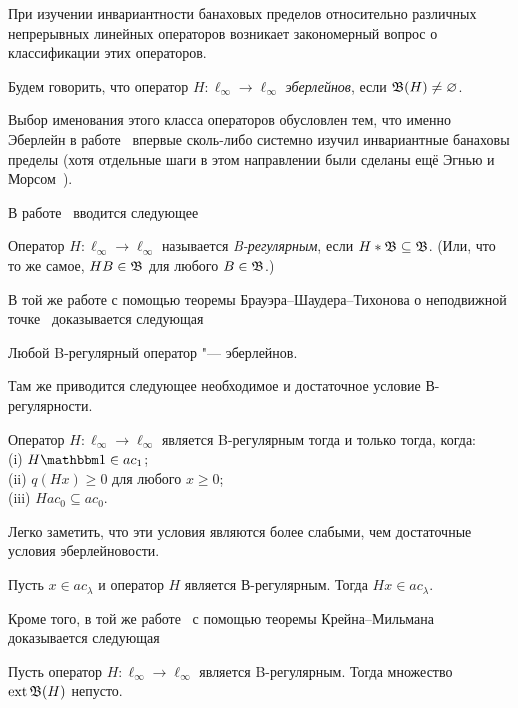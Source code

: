 При изучении инвариантности банаховых пределов относительно различных непрерывных линейных операторов
возникает закономерный вопрос о классификации этих операторов.

\begin{definition}
	Будем говорить, что оператор $H : \ell_\infty \to \ell_\infty$ \emph{эберлейнов},
	если $\mathfrak{B} (H) \ne \varnothing$.
\end{definition}

Выбор именования этого класса операторов обусловлен тем, что именно Эберлейн в работе~\cite{Eberlein}
впервые сколь-либо системно изучил инвариантные банаховы пределы
(хотя отдельные шаги в этом направлении были сделаны ещё Эгнью и Морсом~\cite{agnew1938linear,agnew1938extensions}).

В работе~\cite{alekhno2018invariant} вводится следующее

\begin{definition}
	Оператор $H : \ell_\infty \to \ell_\infty$ называется \emph{B-регулярным},
	если $H*\mathfrak{B} \subseteq \mathfrak{B}$.
	(Или, что то же самое, $HB\in\mathfrak{B}$ для любого $B\in\mathfrak{B}$.)
\end{definition}

В той же работе с помощью теоремы Брауэра--Шаудера--Тихонова о неподвижной точке~\cite[Corollary  17.56]{aliprantis2006infinite}
доказывается следующая
\begin{theorem}
	\label{thm:B-regular_is_Eberlein}
	Любой B-регулярный оператор "--- эберлейнов.
\end{theorem}
Там же приводится следующее необходимое и достаточное условие В-регулярности.

\begin{theorem}
	\label{thm:crit_B_regularity}
	Оператор $H:\ell_\infty \to \ell_\infty$ является B-регулярным тогда и только тогда, когда:
	\\(i) $H\one \in ac_1$;
	\\(ii) $q(Hx)\geq 0$ для любого $x\geq 0$;
	\\(iii) $H ac_0 \subseteq ac_0$.
\end{theorem}
Легко заметить, что эти условия являются более слабыми, чем достаточные условия эберлейновости.

\begin{corollary}
	Пусть $x\in ac_\lambda$ и оператор $H$ является В-регулярным.
	Тогда $Hx \in ac_\lambda$.
\end{corollary}

Кроме того, в той же работе~\cite{alekhno2018invariant}
с помощью теоремы Крейна--Мильмана~\cite[Theorem  9.14]{aliprantis2006positive}
доказывается следующая
\begin{lemma}
	Пусть оператор $H:\ell_\infty\to\ell_\infty$ является B-регулярным.
	Тогда множество $\operatorname{ext}\mathfrak{B}(H)$ непусто.
\end{lemma}

